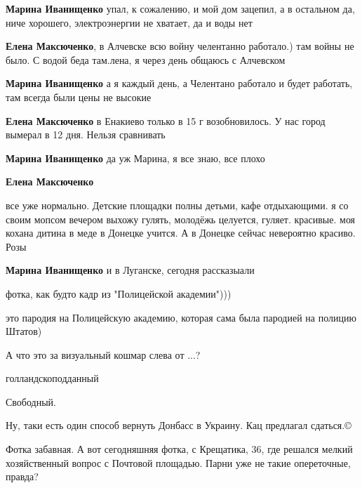 \begin{itemize}
\begin{itemize}
\textbf{Марина Иванищенко} упал, к сожалению, и мой дом зацепил, а в остальном да, ниче хорошего, электроэнергии не хватает, да и воды нет

\textbf{Елена Максюченко}, в Алчевске всю войну челентанно работало.) там войны не было. С водой беда там.лена, я через день общаюсь с Алчевском

\textbf{Марина Иванищенко} а я каждый день, а Челентано работало и будет работать, там всегда были цены не высокие

\textbf{Елена Максюченко} в Енакиево только в 15 г возобновилось. У нас город вымерал в 12 дня. Нельзя сравнивать

\textbf{Марина Иванищенко} да уж Марина, я все знаю, все плохо

\textbf{Елена Максюченко} 

все уже нормально. Детские площадки полны детьми, кафе отдыхающими. я со своим
мопсом вечером выхожу гулять, молодёжь целуется, гуляет. красивые. моя кохана
дитина в меде в Донецке учится. А в Донецке сейчас невероятно красиво. Розы

\textbf{Марина Иванищенко} и в Луганске, сегодня рассказыали

\end{itemize} %

фотка, как будто кадр из "Полицейской академии")))

\begin{itemize} %
это пародия на Полицейскую академию, которая сама была пародией на полицию Штатов)
\end{itemize} %

А что это за визуальный кошмар слева от ...?

\begin{itemize} %
голландскоподданный

Свободный.
\end{itemize} %

Ну, таки есть один способ вернуть Донбасс в Украину.
Кац предлагал сдаться.©


Фотка забавная. А вот сегодняшняя фотка, с Крещатика, 36, где решался мелкий
хозяйственный вопрос с Почтовой площадью. Парни уже не такие опереточные,
правда?


\end{itemize}

